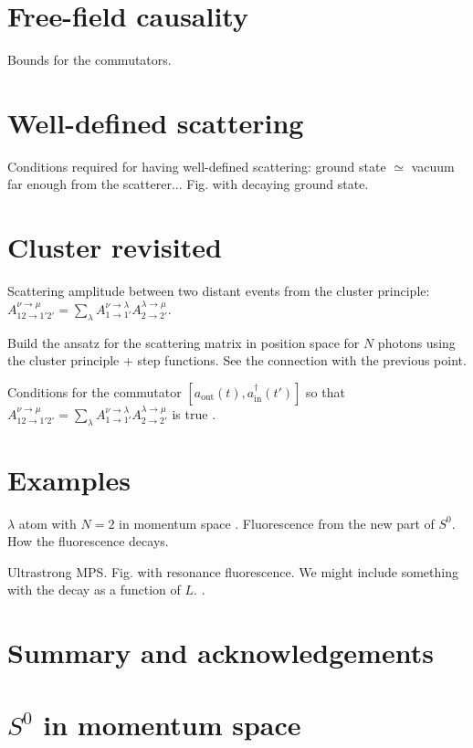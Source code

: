 \documentclass[aps,pra,reprint,amsmath,amssymb]{revtex4-1}
\begin{document}
\section{Free-field causality}

Bounds for the commutators.

\section{Well-defined scattering}

Conditions required for having well-defined scattering: ground state $\simeq$ vacuum far enough from the scatterer... Fig. with decaying ground state.

\section{Cluster revisited}

Scattering amplitude between two distant events from the cluster principle: $A_{12\to 1'2'}^{\nu\to\mu} = \sum_\lambda A_{1\to 1'}^{\nu\to\lambda}A_{2\to 2'}^{\lambda\to\mu}$.

Build the ansatz for the scattering matrix in position space for $N$ photons using the cluster principle + step functions. See the connection with the previous point.

Conditions for the commutator $[a_\text{out}(t),a_\text{in}^\dagger(t')]$ so that $A_{12\to 1'2'}^{\nu\to\mu} = \sum_\lambda A_{1\to 1'}^{\nu\to\lambda}A_{2\to 2'}^{\lambda\to\mu}$ is true \cite{Xu2015}.

\section{Examples}

$\lambda$ atom with $N=2$ in momentum space \cite{Xu2016}. Fluorescence from the new part of $S^0$. How the fluorescence decays.

Ultrastrong MPS. Fig. with resonance fluorescence. We might include something with the decay as a function of $L$. \cite{Sanchez-Burillo2014,Sanchez-Burillo2015}.

\section{Summary and acknowledgements}

\appendix

\section{$S^0$ in momentum space}
\end{document}
